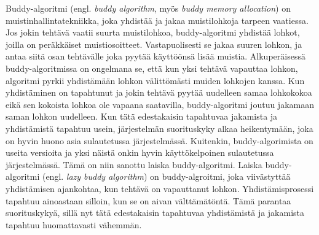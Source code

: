 Buddy-algoritmi (engl. \textit{buddy algorithm}, myös \textit{buddy memory allocation}) on muistinhallintatekniikka, joka yhdistää ja jakaa muistilohkoja tarpeen vaatiessa. Jos jokin tehtävä vaatii suurta muistilohkoa, buddy-algoritmi yhdistää lohkot, joilla on peräkkäiset muistiosoitteet. Vastapuolisesti se jakaa suuren lohkon, ja antaa siitä osan tehtävälle joka pyytää käyttöönsä lisää muistia. Alkuperäisessä buddy-algoritmissa on ongelmana se, että kun yksi tehtävä vapauttaa lohkon, algoritmi pyrkii yhdistämään lohkon välittömästi muiden lohkojen kanssa. Kun yhdistäminen on tapahtunut ja jokin tehtävä pyytää uudelleen samaa lohkokokoa eikä sen kokoista lohkoa ole vapaana saatavilla, buddy-algoritmi joutuu jakamaan saman lohkon uudelleen. Kun tätä edestakaisin tapahtuvaa jakamista ja yhdistämistä tapahtuu usein, järjestelmän suorituskyky alkaa heikentymään, joka on hyvin huono asia sulautetussa järjestelmässä. Kuitenkin, buddy-algorimista on useita versioita ja yksi näistä onkin hyvin käyttökelpoinen sulautetussa järjestelmässä. Tämä on niin sanottu laiska buddy-algoritmi. Laiska buddy-algoritmi (engl. \textit{lazy buddy algorithm}) on buddy-algroitmi, joka viivästyttää yhdistämisen ajankohtaa, kun tehtävä on vapauttanut lohkon. Yhdistämisprosessi tapahtuu ainoastaan silloin, kun se on aivan välttämätöntä. Tämä parantaa suorituskykyä, sillä nyt tätä edestakaisin tapahtuvaa yhdistämistä ja jakamista tapahtuu huomattavasti vähemmän.\cite{soeosmm@2009}